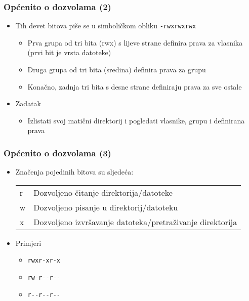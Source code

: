 \documentclass[table,usenames,dvipsnames]{beamer}
\newcommand{\shell}[1]{\texttt{#1}}
\begin{document}
\begin{frame}[t]
\frametitle{Općenito o dozvolama (2)}
\begin{itemize}
  \item Tih devet bitova piše se u simboličkom obliku \shell{-rwxrwxrwx}
  \begin{itemize}
    \item Prva grupa od tri bita (rwx) s lijeve strane definira prava za 
          vlasnika (prvi bit je vrsta datoteke)
    \item Druga grupa od tri bita (sredina) definira prava za grupu
    \item Konačno, zadnja tri bita s desne strane definiraju prava za sve 
          ostale
  \end{itemize}
  \item Zadatak
  \begin{itemize}
    \item Izlistati svoj matični direktorij i pogledati vlasnike, grupu i 
          definirana prava
  \end{itemize}
\end{itemize}
\end{frame}

\begin{frame}[t]
\frametitle{Općenito o dozvolama (3)}
\begin{itemize}
  \item Značenja pojedinih bitova su sljedeća:
    \begin{tabular}{l l}
     r &  Dozvoljeno čitanje direktorija/datoteke \\
     w & Dozvoljeno pisanje u direktorij/datoteku \\
     x &  Dozvoljeno izvršavanje datoteka/pretraživanje direktorija
    \end{tabular}
  \item Primjeri
  \begin{itemize}
    \item[] \shell{rwxr-xr-x}
    \item[] \shell{rw-r-{}-r-{}-}
    \item[] \shell{r-{}-r-{}-r-{}-}
  \end{itemize}
\end{itemize}
\end{frame}
\end{document}
